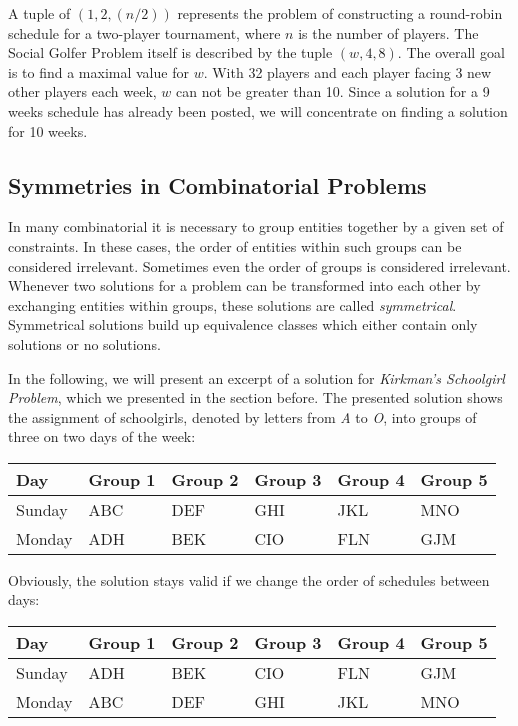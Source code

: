 \documentclass[a4paper]{scrartcl}
\begin{document}
A tuple of $(1,2,(n/2))$ represents the problem of constructing a round-robin schedule for a two-player tournament, where $n$ is the number of players. The Social Golfer Problem itself is described by the tuple $(w,4,8)$. The overall goal is to find a maximal value for $w$. With 32 players and each player facing 3 new other players each week, $w$ can not be greater than 10. Since a solution for a 9 weeks schedule has already been posted, we will concentrate on finding a solution for 10 weeks.

\subsection{Symmetries in Combinatorial Problems}

In many combinatorial it is necessary to group entities together by a given set of constraints. In these cases, the order of entities within such groups can be considered irrelevant. Sometimes even the order of groups is considered irrelevant. Whenever two solutions for a problem can be transformed into each other by exchanging entities within groups, these solutions are called \emph{symmetrical}. Symmetrical solutions build up equivalence classes which either contain only solutions or no solutions\cite{Smith01}.

In the following, we will present an excerpt of a solution for \emph{Kirkman's Schoolgirl Problem}, which we presented in the section before. The presented solution shows the assignment of schoolgirls, denoted by letters from \emph{A} to \emph{O}, into groups of three on two days of the week:

\begin{table}[h]
\centering
\begin{tabular}{ l | l  l  l l  l }
Day & Group 1 & Group 2 & Group 3 & Group 4 & Group 5 \\
\hline
Sunday & ABC & DEF & GHI & JKL & MNO \\
Monday & ADH  & BEK & CIO & FLN & GJM \\
\end{tabular}
\end{table}

Obviously, the solution stays valid if we change the order of schedules between days:

\begin{table}[h]
\centering
\begin{tabular}{ l | l  l  l l  l }
Day & Group 1 & Group 2 & Group 3 & Group 4 & Group 5 \\
\hline
Sunday & ADH  & BEK & CIO & FLN & GJM \\
Monday & ABC & DEF & GHI & JKL & MNO \\
\end{tabular}
\end{table}
\end{document}
